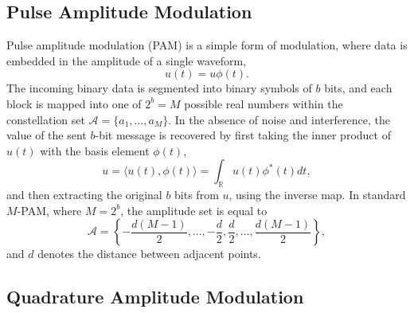\iffalse
\subsection{Pulse Amplitude Modulation}

Pulse amplitude modulation (PAM) is a simple form of modulation, where data is embedded in the amplitude of a single waveform,
\begin{equation*}
u(t) = u \phi (t) .
\end{equation*}
The incoming binary data is segmented into binary symbols of $b$ bits, and each block is mapped into one of $2^b = M$ possible real numbers within the constellation set $\mathcal{A} = \{ a_1, \ldots, a_M \}$.
In the absence of noise and interference, the value of the sent $b$-bit message is recovered by first taking the inner product of $u(t)$ with the basis element $\phi (t)$,
\begin{equation*}
u = \langle u(t), \phi(t) \rangle = \int_{\mathbb{R}} u(t) \phi^*(t) dt ,
\end{equation*}
and then extracting the original $b$ bits from $u$, using the inverse map.
In standard $M$-PAM, where $M = 2^b$, the amplitude set is equal to
\begin{equation*}
\mathcal{A} = \left\{ - \frac{d(M-1)}{2} , \ldots, - \frac{d}{2}, \frac{d}{2}, \ldots, \frac{d(M-1)}{2} \right\} ,
\end{equation*}
and $d$ denotes the distance between adjacent points.

\subsection{Quadrature Amplitude Modulation}


